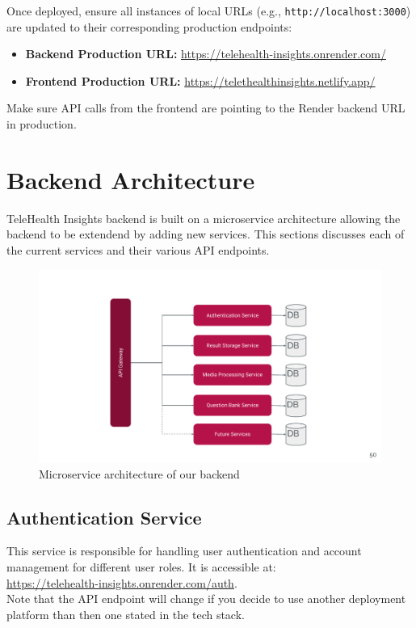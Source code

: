 \documentclass{article}
\begin{document}
Once deployed, ensure all instances of local URLs (e.g., \texttt{http://localhost:3000}) are updated to their corresponding production endpoints:

\begin{itemize}
    \item \textbf{Backend Production URL:} \url{https://telehealth-insights.onrender.com/}
    \item \textbf{Frontend Production URL:} \url{https://telethealthinsights.netlify.app/}
\end{itemize}

Make sure API calls from the frontend are pointing to the Render backend URL in production.


\section{Backend Architecture}
    TeleHealth Insights backend is built on a microservice architecture allowing the backend to be extendend by adding new services.
    This sections discusses each of the current services and their various API endpoints.
\begin{figure}[H]
    \centering
    \includegraphics[scale=0.5]{images/Telehealth Insights Capstone Presentation.pdf}
    \caption{Microservice architecture of our backend}
  \end{figure}

  \subsection{Authentication Service}
  This service is responsible for handling user authentication and account management 
  for different user roles. It is accessible at: \\
  \url{https://telehealth-insights.onrender.com/auth}.\\ Note that the API endpoint will change if you decide to use another deployment platform than then one stated in the tech stack.
  
\end{document}
